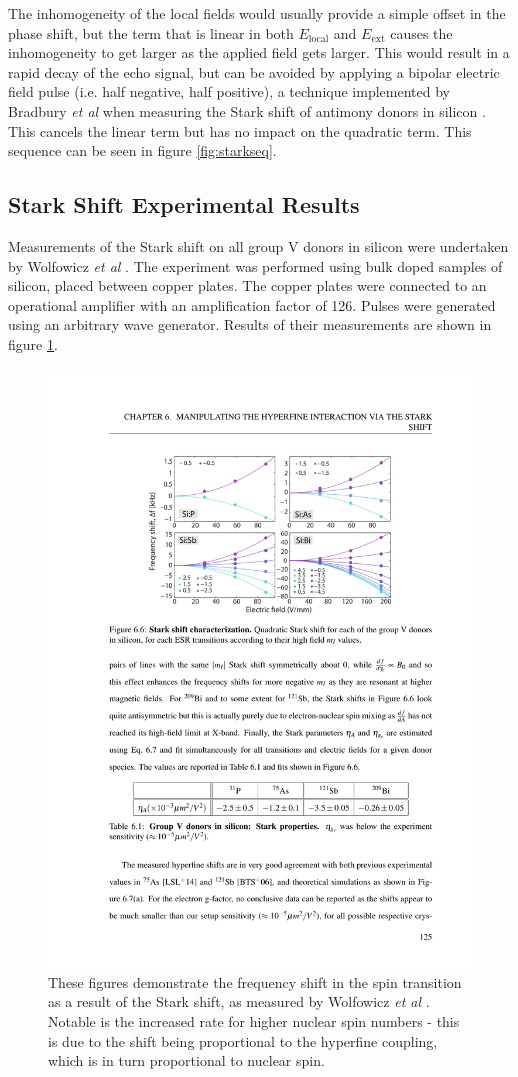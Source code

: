 The inhomogeneity of the local fields would usually provide a simple offset in the phase shift, but the term that is linear in both $E_{\text{local}}$ and $E_{\text{ext}}$ causes the inhomogeneity to get larger as the applied field gets larger.
This would result in a rapid decay of the echo signal, but can be avoided by applying a bipolar electric field pulse (i.e. half negative, half positive), a technique implemented by Bradbury \emph{et al} when measuring the Stark shift of antimony donors in silicon \cite{Bradbury2007}.
This cancels the linear term but has no impact on the quadratic term.
This sequence can be seen in figure \ref{fig:starkseq}. 

\subsection{Stark Shift Experimental Results}

Measurements of the Stark shift on all group V donors in silicon were undertaken by Wolfowicz \emph{et al} \cite{Wolfowicz2014,Pica2014}. 
The experiment was performed using bulk doped samples of silicon, placed between copper plates.
The copper plates were connected to an operational amplifier with an amplification factor of 126.
Pulses were generated using an arbitrary wave generator.
Results of their measurements are shown in figure \ref{fig:garyStarkResults}.

\begin{figure}
\centering
\includegraphics[width=0.75\columnwidth]{Figures/starkShiftResultsGary.pdf}
\caption[Wolfowicz \emph{et al} Stark measurements]{These figures demonstrate the frequency shift in the spin transition as a result of the Stark shift, as measured by Wolfowicz \emph{et al} \cite{Wolfowicz2014}. Notable is the increased rate for higher nuclear spin numbers - this is due to the shift being proportional to the hyperfine coupling, which is in turn proportional to nuclear spin.}
\label{fig:garyStarkResults}
\end{figure}

